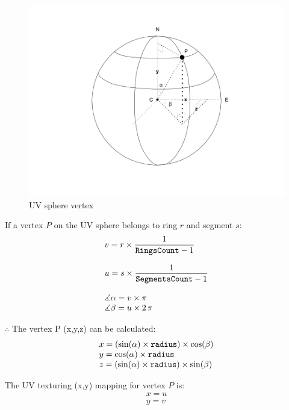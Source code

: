 \begin{figure}[H]
\caption{UV sphere vertex}
\label{fig:uv-sphere-vertex}
\centering
\includegraphics[width=\textwidth, keepaspectratio]{Figures/uv-sphere-vertex.png}
\decoRule
\end{figure}

If a vertex $P$ on the UV sphere belongs to ring $r$ and segment $s$:
\[
\begin{array}{lr}
v = r \times  \dfrac{1}{\texttt{RingsCount} - 1}\\\\
u = s \times  \dfrac{1}{\texttt{SegmentsCount} - 1}\\\\
\measuredangle \alpha = v \times \pi\\
\measuredangle \beta = u \times 2\,\pi\\
\end{array}
\]

$\therefore$ The vertex P (x,\;y,\;z) can be calculated:
\[
\begin{array}{lr}
x = (\sin(\alpha) \times \texttt{radius}) \times \cos(\beta)\\
y = \cos(\alpha) \times \texttt{radius}\\
z =  (\sin(\alpha) \times \texttt{radius}) \times \sin(\beta)\\
\end{array}
\]

The UV texturing (x,\;y) mapping for vertex $P$ is:
\[
\begin{array}{lr}
x = u\\
y = v\\
\end{array}
\]

